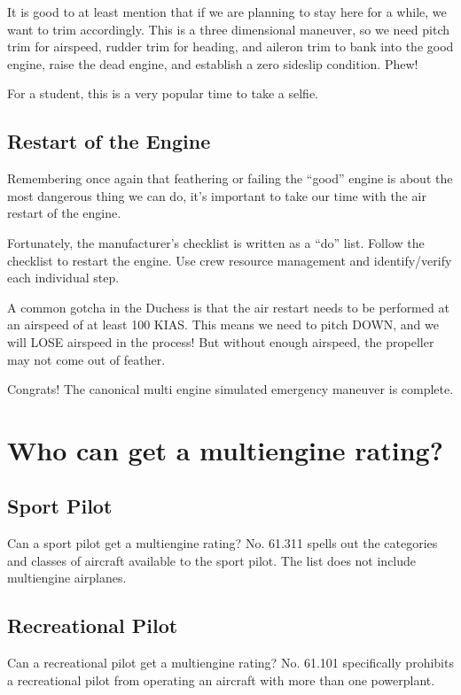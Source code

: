 It is good to at least mention that if we are planning to stay here for a while, we want to trim accordingly. This is a three dimensional maneuver, so we need pitch trim for airspeed, rudder trim for heading, and aileron trim to bank into the good engine, raise the dead engine, and establish a zero sideslip condition. Phew!

For a student, this is a very popular time to take a selfie.

\subsection{Restart of the Engine}

Remembering once again that feathering or failing the ``good'' engine is about the most dangerous thing we can do, it's important to take our time with the air restart of the engine.

Fortunately, the manufacturer's checklist is written as a ``do'' list. Follow the checklist to restart the engine. Use crew resource management and identify/verify each individual step.

A common gotcha in the Duchess is that the air restart needs to be performed at an airspeed of at least 100 KIAS. This means we need to pitch
DOWN, and we will LOSE airspeed in the process! But without enough airspeed, the propeller may not come out of feather.

Congrats! The canonical multi engine simulated emergency maneuver is complete.

\section{Who can get a multiengine rating?}

\subsection{Sport Pilot}

Can a sport pilot get a multiengine rating? No. 61.311 spells out the categories and classes
of aircraft available to the sport pilot. The list does not include multiengine airplanes.

\subsection{Recreational Pilot}

Can a recreational pilot get a multiengine rating? No. 61.101 specifically prohibits
a recreational pilot from operating an aircraft with more than one powerplant.


